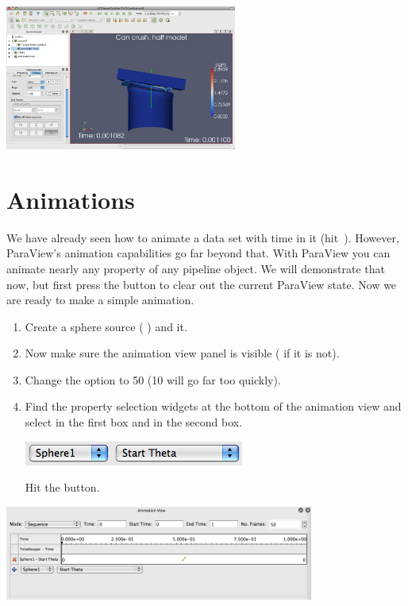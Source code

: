 \begin{inlinefig}
  \includegraphics[width=3in]{images/AnnotateTimeFilter}
\end{inlinefig}


\section{Animations}

We have already seen how to animate a data set with time in it
(hit~\vcrPlay).  However, ParaView’s animation capabilities go far beyond
that.  With ParaView you can animate nearly any property of any pipeline
object.  We will demonstrate that now, but first press the \disconnect
button to clear out the current ParaView state.  Now we are ready to make a
simple animation.

\begin{enumerate}
\item Create a sphere source ( \ra {}) and \apply it.
\item Now make sure the animation view panel is visible ( \ra
   if it is not).
\item Change the  option to 50 (10 will go far too quickly).
\item Find the property selection widgets at the bottom of the animation
  view and select  in the first box and  in
  the second box.
  \begin{inlinefig}
    \includegraphics[height=1.5\baselineskip]{images/AddStartThetaTrack}
  \end{inlinefig}
  Hit the  button.
  \savecounter
\end{enumerate}

\begin{inlinefig}
  \includegraphics[width=4in]{images/BuildAnimation1}
\end{inlinefig}

